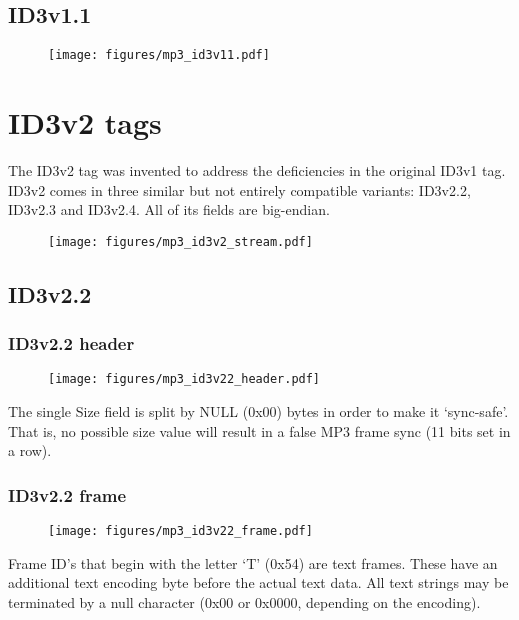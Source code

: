 \subsection{ID3v1.1}

\begin{figure}[h]
\texttt{[image: figures/mp3\_id3v11.pdf]}
\end{figure}

\section{ID3v2 tags}

The ID3v2 tag was invented to address the deficiencies in the original
ID3v1 tag.
ID3v2 comes in three similar but not entirely compatible variants:
ID3v2.2, ID3v2.3 and ID3v2.4.
All of its fields are big-endian.

\begin{figure}[h]
\texttt{[image: figures/mp3\_id3v2\_stream.pdf]}
\end{figure}

\subsection{ID3v2.2}

\subsubsection{ID3v2.2 header}

\begin{figure}[h]
\texttt{[image: figures/mp3\_id3v22\_header.pdf]}
\end{figure}
\par
\noindent
The single Size field is split by NULL (0x00) bytes in order to make
it `sync-safe'.  That is, no possible size value will result in a false
MP3 frame sync (11 bits set in a row).

\subsubsection{ID3v2.2 frame}

\begin{figure}[h]
\texttt{[image: figures/mp3\_id3v22\_frame.pdf]}
\end{figure}
\par
\noindent
Frame ID's that begin with the letter `T' (0x54) are text frames.
These have an additional text encoding byte before the actual
text data.
All text strings may be terminated by a null character
(0x00 or 0x0000, depending on the encoding).

